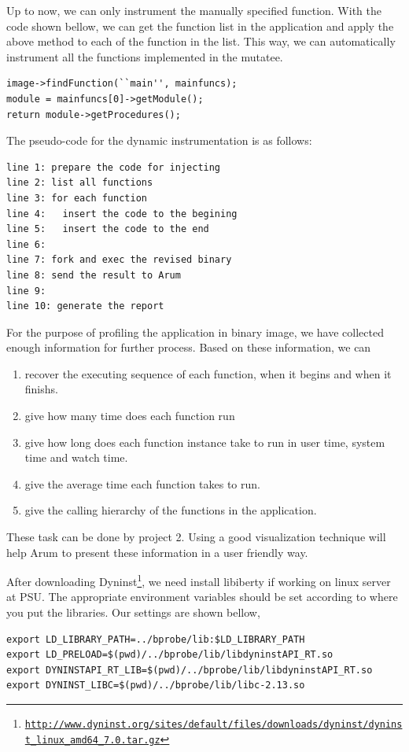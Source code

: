 \documentclass[11pt,letterpaper,oneside]{article}
\begin{document}
Up to now, we can only instrument the manually specified function. With the code shown bellow, we can get the function list in the application and apply the above method to each of the function in the list. This way, we can automatically instrument all the functions implemented in the mutatee.
\begin{Verbatim}[frame=single]
image->findFunction(``main'', mainfuncs);
module = mainfuncs[0]->getModule();
return module->getProcedures();
\end{Verbatim}

The pseudo-code for the dynamic instrumentation is as follows:
\begin{Verbatim}[frame=single]
line 1: prepare the code for injecting
line 2: list all functions
line 3: for each function
line 4:   insert the code to the begining
line 5:   insert the code to the end
line 6:
line 7: fork and exec the revised binary
line 8: send the result to Arum
line 9: 
line 10: generate the report
\end{Verbatim}

For the purpose of profiling the application in binary image, we have collected enough information for further process. Based on these information, we can
\begin{enumerate}
\item recover the executing sequence of each function, when it begins and when it finishs.
\item give how many time does each function run
\item give how long does each function instance take to run in user time, system time and watch time.
\item give the average time each function takes to run.
\item give the calling hierarchy of the functions in the application.
\end{enumerate}
These task can be done by project 2. Using a good visualization technique will help Arum to present these information in a user friendly way.

After downloading Dyninst\footnote{\texttt{\url{http://www.dyninst.org/sites/default/files/downloads/dyninst/dyninst_linux_amd64_7.0.tar.gz}}}, we need install libiberty if working on linux server at PSU. The appropriate environment variables should be set according to where you put the libraries. Our settings are shown bellow,

\begin{Verbatim}[frame=single]
export LD_LIBRARY_PATH=../bprobe/lib:$LD_LIBRARY_PATH
export LD_PRELOAD=$(pwd)/../bprobe/lib/libdyninstAPI_RT.so
export DYNINSTAPI_RT_LIB=$(pwd)/../bprobe/lib/libdyninstAPI_RT.so
export DYNINST_LIBC=$(pwd)/../bprobe/lib/libc-2.13.so
\end{Verbatim}
\end{document}
